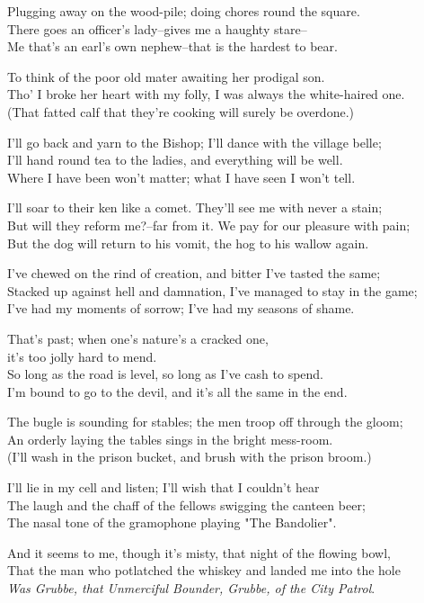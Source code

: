 \begin{poemblock}
Plugging away on the wood-pile; doing chores round the square.\\
There goes an officer's lady--gives me a haughty stare--\\
Me that's an earl's own nephew--that is the hardest to bear.

To think of the poor old mater awaiting her prodigal son.\\
Tho' I broke her heart with my folly, I was always the white-haired one.\\
(That fatted calf that they're cooking will surely be overdone.)

I'll go back and yarn to the Bishop; I'll dance with the village belle;\\
I'll hand round tea to the ladies, and everything will be well.\\
Where I have been won't matter; what I have seen I won't tell.

I'll soar to their ken like a comet.  They'll see me with never a stain;\\
But will they reform me?--far from it.  We pay for our pleasure with pain;\\
But the dog will return to his vomit, the hog to his wallow again.

I've chewed on the rind of creation, and bitter I've tasted the same;\\
Stacked up against hell and damnation, I've managed to stay in the game;\\
I've had my moments of sorrow; I've had my seasons of shame.

That's past; when one's nature's a cracked one,\\
\idt it's too jolly hard to mend.\\
So long as the road is level, so long as I've cash to spend.\\
I'm bound to go to the devil, and it's all the same in the end.

The bugle is sounding for stables; the men troop off through the gloom;\\
An orderly laying the tables sings in the bright mess-room.\\
(I'll wash in the prison bucket, and brush with the prison broom.)

I'll lie in my cell and listen; I'll wish that I couldn't hear\\
The laugh and the chaff of the fellows swigging the canteen beer;\\
The nasal tone of the gramophone playing "The Bandolier".

And it seems to me, though it's misty, that night of the flowing bowl,\\
That the man who potlatched the whiskey and landed me into the hole\\
\textit{Was Grubbe, that Unmerciful Bounder, Grubbe, of the City Patrol}.

\end{poemblock}
